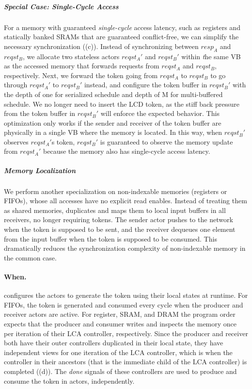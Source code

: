 \subparagraph{Special Case: Single-Cycle Access}
For a memory with guaranteed {\em single-cycle} access latency, such as registers and statically banked SRAMs that are guaranteed conflict-free, we can simplify the necessary synchronization ((c)).
Instead of synchronizing between $resp_A$ and $reqst_B$, we allocate two stateless actors $reqst_A'$ and $reqst_B'$ within {\emph the same} VB as the accessed memory that forwards requests from $reqst_A$ and $reqst_B$, respectively.
Next, we forward the token going from $reqst_A$ to $reqst_B$ to go through $reqst_A'$ to $reqst_B'$ instead, and configure the token buffer in $reqst_B'$ with the depth of one for serialized schedule and depth of M for multi-buffered schedule. 
We no longer need to insert the LCD token, as the stiff back pressure from the token buffer in $reqst_B'$ will enforce the expected behavior.
This optimization only works if the sender and receiver of the token buffer are physically in a single VB where the memory is located.
In this way, when $reqst_B'$ observes $reqst_A'$s token, $reqst_B'$ is guaranteed to observe the memory update from $reqst_A'$ because the memory also has single-cycle access latency.

\subparagraph{Memory Localization}
We perform another specialization on non-indexable memories (registers or FIFOs), whose all accesses have no explicit read enables.
Instead of treating them as shared memories, \name{} duplicates and maps them to local input buffers in all receivers, no longer requiring tokens.
The sender actor pushes to the network when the token is supposed to be sent, and the receiver dequeues one element from the input buffer when the token is supposed to be consumed.
This dramatically reduces the synchronization complexity of non-indexable memory in the common case.

\paragraph{When.}
\name{} configures the actors to generate the token using their local states at runtime.
For FIFOs, the token is generated and consumed every cycle when the producer and receiver actors are active.
For register, SRAM, and DRAM the program order expects that the producer and consumer writes and inspects the memory once per iteration of their LCA controller, respectively.
Since the producer and receiver both have their outer controllers duplicated in their local state, they have independent views for one iteration of the LCA controller, which is when the controller in their ancestors (that is the immediate child of the LCA controller) is completed ((d)).
The {\em done} signals of these controllers are used to produce and consume the token in actors, independently.

